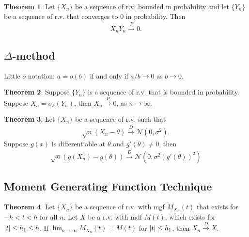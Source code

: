 \documentclass{book}
\theoremstyle{definition}
\newtheorem{thm}{Theorem}[section]
\newcommand{\N}{\mathcal{N}}
\begin{document}
\begin{thm} Let $\{ X_n\}$ be a sequence of r.v. bounded in probability and let $\{ Y_n\}$ be a sequence of r.v. that converges to $0$ in probability. Then
\begin{align}
X_n Y_n \xrightarrow{P} 0.
\end{align}
\end{thm}













\subsection{$\Delta$-method}

Little $o$ notation: $a = o(b)$ if and only if $a/b \to 0$ as $b\to 0$.\\

\begin{thm} Suppose $\{ Y_n\}$ is a sequence of r.v. that is bounded in probability. Suppose $X_n = o_P(Y_n)$, then $X_n \xrightarrow{P} 0$, as $n\to \infty$.
\end{thm}


\begin{thm} Let $\{ X_n \}$ be a sequence of r.v. such that
\begin{align}
\sqrt{n}(X_n - \theta) \xrightarrow{D} \N(0,\sigma^2).
\end{align}
Suppose $g(x)$ is differentiable at $\theta$ and $g'(\theta) \neq 0$, then
\begin{align}
\sqrt{n}(g(X_n) - g(\theta)) \xrightarrow{D} \N(0, \sigma^2(g'(\theta))^2 )
\end{align}
\end{thm}



\subsection{Moment Generating Function Technique}



\begin{thm} Let $\{ X_n \}$ be a sequence of r.v. with mgf $M_{X_n}(t)$ that exists for $-h < t < h$ for all $n$. Let $X$ be a r.v. with mdf $M(t)$, which exists for $\abs{t} \leq h_1 \leq h$. If $\lim_{n\to \infty} M_{X_n}(t) = M(t)$ for $\abs{t} \leq h_1$, then $X_n \xrightarrow{D} X$.
\end{thm}
\end{document}
